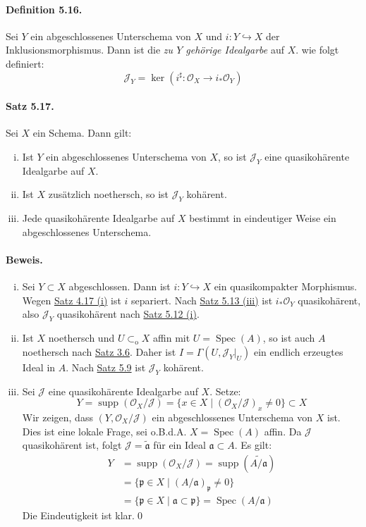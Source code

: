 \paragraph{Definition 5.16.}\label{5.16} Sei $Y$ ein abgeschlossenes Unterschema von $X$ und $i:Y\hookrightarrow X$ der Inklusionsmorphismus. Dann ist die \textit{zu $Y$ gehörige Idealgarbe} auf $X$. wie folgt definiert:
\[\mathcal{J}_Y=\ker(i^\sharp:\mathcal{O}_X\to i_\ast\mathcal{O}_Y) \]

\paragraph{Satz 5.17.}\label{5.17} Sei $X$ ein Schema. Dann gilt:
\begin{enumerate}[(i)]
\item Ist $Y$ ein abgeschlossenes Unterschema von $X$, so ist $\mathcal{J}_Y$ eine quasikohärente Idealgarbe auf $X$.
\item Ist $X$ zusätzlich noethersch, so ist $\mathcal{J}_Y$ kohärent.
\item Jede quasikohärente Idealgarbe auf $X$ bestimmt in eindeutiger Weise ein abgeschlossenes Unterschema.
\end{enumerate}

\paragraph{Beweis.}\begin{enumerate}[(i)]
\item Sei $Y\subset X$ abgeschlossen. Dann ist $i:Y\hookrightarrow X$ ein quasikompakter Morphismus. Wegen \hyperref[4.17]{Satz 4.17 (i)} ist $i$ separiert. Nach \hyperref[5.13]{Satz 5.13 (iii)} ist $i_\ast\mathcal{O}_Y$ quasikohärent, also $\mathcal{J}_Y$ quasikohärent nach \hyperref[5.12]{Satz 5.12 (i)}.
\item Ist $X$ noethersch und $U\subset_\text{o}X$ affin mit $U=\operatorname{Spec}(A)$, so ist auch $A$ noethersch nach \hyperref[3.6]{Satz 3.6}. Daher ist $I=\Gamma(U,\mathcal{J}_Y|_U)$ ein endlich erzeugtes Ideal in $A$. Nach \hyperref[5.9]{Satz 5.9} ist $\mathcal{J}_Y$ kohärent.
\item Sei $\mathcal{J}$ eine quasikohärente Idealgarbe auf $X$. Setze:
\[Y=\operatorname{supp}(\mathcal{O}_X/\mathcal{J})=\{x\in X\mid (\mathcal{O}_X/\mathcal{J})_x\neq 0 \}\subset X \]
Wir zeigen, dass $(Y,\mathcal{O}_X/\mathcal{J})$ ein abgeschlossenes Unterschema von $X$ ist. Dies ist eine lokale Frage, sei o.B.d.A. $X=\operatorname{Spec}(A)$ affin. Da $\mathcal{J}$ quasikohärent ist, folgt $\mathcal{J}=\widetilde{\mathfrak{a}}$ für ein Ideal $\mathfrak{a}\subset A$. Es gilt:
\begin{align*}
Y&=\operatorname{supp}(\mathcal{O}_X/\mathcal{J})=\operatorname{supp}(\widetilde{A/\mathfrak{a}})\\
&= \{\mathfrak{p}\in X\mid (A/\mathfrak{a})_\mathfrak{p}\neq 0\}\\
&=\{\mathfrak{p}\in X\mid\mathfrak{a}\subset\mathfrak{p}\}=\operatorname{Spec}(A/\mathfrak{a})
\end{align*}
Die Eindeutigkeit ist klar.\qed
\end{enumerate}

